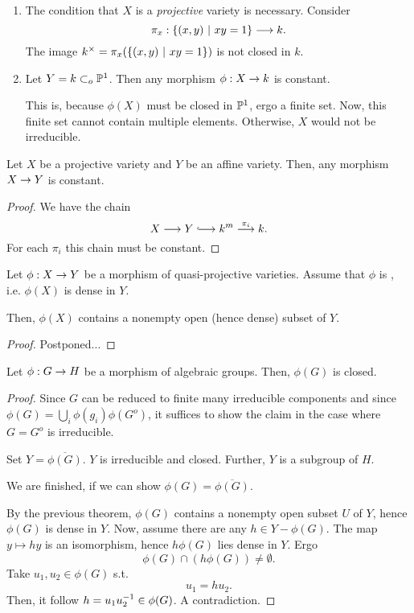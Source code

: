 \begin{example}
	\begin{enumerate}
		\item The condition that $X$ is a \emph{projective} variety is necessary. Consider
		\[ \pi_x : \set{(x,y)}{xy = 1} \Pfeil{} k. \]
		The image $k^\times = \pi_x(\set{(x,y)}{xy = 1})$ is not closed in $k$.
		\item Let $Y = k \subset_o \P^1$. Then any morphism $\phi : X \pfeil{} k$ is constant.
		
		This is, because $\phi(X)$ must be closed in $\P^1$, ergo a finite set. Now, this finite set cannot contain multiple elements. Otherwise, $X$ would not be irreducible.
	\end{enumerate}
\end{example}

\begin{corollary}
		Let $X$ be a projective variety and $Y$ be an affine variety.
		Then, any morphism $X \pfeil{} Y$ is constant.
\end{corollary}
\begin{proof}
	We have the chain
	\[ X \Pfeil{} Y \Inj{} k^m \Pfeil{\pi_i} k. \]
	For each $\pi_i$ this chain must be constant.
\end{proof}


\begin{theorem}[Thm3]
	Let $\phi : X \pfeil{} Y$ be a morphism of quasi-projective varieties. Assume that $\phi$ is , i.e. $\phi(X)$ is dense in $Y$.
	
	Then, $\phi(X)$ contains a nonempty open (hence dense) subset of $Y$.
\end{theorem}
\begin{proof}
	Postponed...
\end{proof}
\begin{corollary}
	Let $\phi : G \pfeil{} H$ be a morphism of algebraic groups. Then, $\phi(G)$ is closed.
\end{corollary}
\begin{proof}
Since $G$ can be reduced to finite many irreducible components and since $\phi(G) = \bigcup_i \phi(g_i) \phi(G^o)$, it suffices to show the claim in the case where $G = G^o$ is irreducible.

Set $Y = \overline{\phi(G)}$. $Y$ is irreducible and closed. Further, $Y$ is a subgroup of $H$.

We are finished, if we can show $\phi(G) = \overline{\phi(G)}$.

By the previous theorem, $\phi(G)$ contains a nonempty open subset $U$ of $Y$, hence $\phi(G)$ is dense in $Y$. Now, assume there are any $h \in Y - \phi(G)$.
The map $y \mapsto hy$ is an isomorphism, hence $h\phi(G)$ lies dense in $Y$. Ergo
\[ \phi(G) \cap (h \phi(G)) \neq \emptyset. \]
Take $u_1, u_2 \in \phi(G)$ s.t.
\[ u_1 = h u_2. \]
Then, it follow $h = u_1u_2\i \in \phi(G)$. A contradiction.
\end{proof}